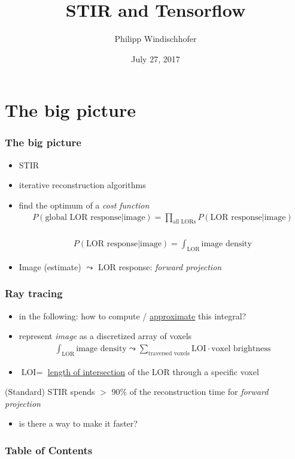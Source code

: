 \documentclass{beamer}
\title{STIR and Tensorflow}
\author{Philipp Windischhofer}
\date{July 27, 2017}
\begin{document}
 
\frame{\titlepage}

\section{The big picture}
\begin{frame}
  \frametitle{The big picture}
  \begin{itemize}
    \item STIR
    \item iterative reconstruction algorithms
    \item find the optimum of a \textsl{cost function}\\
      \begin{align*} P(\text{global LOR response} | \text{image}) = \prod_{\text{all LORs}} P(\text{LOR response} | \text{image})\end{align*}\\
      \begin{align*} P(\text{LOR response} | \text{image}) = \int_{\text{LOR}} \text{image density}\end{align*}
      \item Image (estimate) $\leadsto$ LOR response: \textsl{forward projection}
  \end{itemize}
\end{frame}

\begin{frame}
  \frametitle{Ray tracing}
  \begin{itemize}
    \item in the following: how to compute / \underline{approximate} this integral?
    \item represent \textsl{image} as a discretized array of voxels
    \begin{align*}\int_{\text{LOR}} \text{image density} \leadsto \sum_{\text{traversed voxels}} \text{LOI} \cdot \text{voxel brightness}\end{align*}
    \item $\text{LOI} = $ \underline{length of intersection} of the LOR through a specific voxel
  \end{itemize}
  (Standard) STIR spends $>$ 90\% of the reconstruction time for \textsl{forward projection}
  \begin{itemize}
    \item is there a way to make it faster?
  \end{itemize}
\end{frame}

\begin{frame}
\frametitle{Table of Contents}
\tableofcontents
\end{frame}
\end{document}
